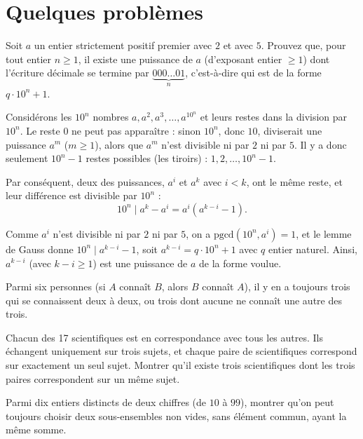 \section*{Quelques problèmes}
\begin{problem}
    Soit $a$ un entier strictement positif premier avec $2$ et avec $5$.
    Prouvez que, pour tout entier $n \geq 1$, il existe une puissance de $a$ (d'exposant entier $\geq 1$) dont l'écriture décimale se termine par $\underset{n}{\underbrace{000 \ldots 01}}$, c'est-à-dire qui est de la forme $q \cdot 10^n + 1$.

    \begin{solution}
        Considérons les $10^n$ nombres $a, a^2, a^3, \ldots, a^{10^n}$ et leurs restes dans la division par $10^n$. Le reste $0$ ne peut pas apparaître : sinon $10^n$, donc $10$, diviserait une puissance $a^m$ ($m \geq 1$), alors que $a^m$ n'est divisible ni par $2$ ni par $5$. Il y a donc seulement $10^n - 1$ restes possibles (les tiroirs) : $1, 2, \ldots, 10^n - 1$.

        Par conséquent, deux des puissances, $a^i$ et $a^k$ avec $i < k$, ont le même reste, et leur différence est divisible par $10^n$ :
        \[
        10^n \mid a^k - a^i = a^i (a^{k-i} - 1).
        \]

        Comme $a^i$ n'est divisible ni par $2$ ni par $5$, on a $\text{pgcd}(10^n, a^i) = 1$, et le lemme de Gauss donne $10^n \mid a^{k-i} - 1$, soit $a^{k-i} = q \cdot 10^n + 1$ avec $q$ entier naturel. Ainsi, $a^{k-i}$ (avec $k-i \geq 1$) est une puissance de $a$ de la forme voulue.
    \end{solution}
\end{problem}

\begin{problem}
    Parmi six personnes (si \( A \) connaît \( B \), alors \( B \) connaît \( A \)), il y en a toujours trois qui se connaissent deux à deux, ou trois dont aucune ne connaît une autre des trois.
\end{problem}
\begin{problem}
    Chacun des 17 scientifiques est en correspondance avec tous les autres.
    Ils échangent uniquement sur trois sujets, et chaque paire de scientifiques correspond sur exactement un seul sujet.
    Montrer qu'il existe trois scientifiques dont les trois paires correspondent sur un même sujet.
\end{problem}

\begin{problem}
    Parmi dix entiers distincts de deux chiffres (de \( 10 \) à \( 99 \)), montrer qu'on peut toujours choisir deux sous-ensembles non vides, sans élément commun, ayant la même somme.
\end{problem}

